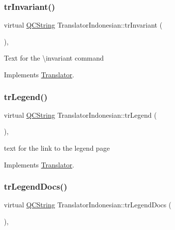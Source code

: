 \subsubsection{\texorpdfstring{trInvariant()}{trInvariant()}}
{\footnotesize\ttfamily virtual \mbox{\hyperlink{class_q_c_string}{Q\+C\+String}} Translator\+Indonesian\+::tr\+Invariant (\begin{DoxyParamCaption}{ }\end{DoxyParamCaption})\hspace{0.3cm}{\ttfamily [inline]}, {\ttfamily [virtual]}}

Text for the \textbackslash{}invariant command 

Implements \mbox{\hyperlink{class_translator}{Translator}}.

\mbox{\label{class_translator_indonesian_aca5409d9e834cd6201757939d41d95f2}} 
\subsubsection{\texorpdfstring{trLegend()}{trLegend()}}
{\footnotesize\ttfamily virtual \mbox{\hyperlink{class_q_c_string}{Q\+C\+String}} Translator\+Indonesian\+::tr\+Legend (\begin{DoxyParamCaption}{ }\end{DoxyParamCaption})\hspace{0.3cm}{\ttfamily [inline]}, {\ttfamily [virtual]}}

text for the link to the legend page 

Implements \mbox{\hyperlink{class_translator}{Translator}}.

\mbox{\label{class_translator_indonesian_a0378f29398c3dab7b6f403453df432d5}} 
\subsubsection{\texorpdfstring{trLegendDocs()}{trLegendDocs()}}
{\footnotesize\ttfamily virtual \mbox{\hyperlink{class_q_c_string}{Q\+C\+String}} Translator\+Indonesian\+::tr\+Legend\+Docs (\begin{DoxyParamCaption}{ }\end{DoxyParamCaption})\hspace{0.3cm}{\ttfamily [inline]}, {\ttfamily [virtual]}}

